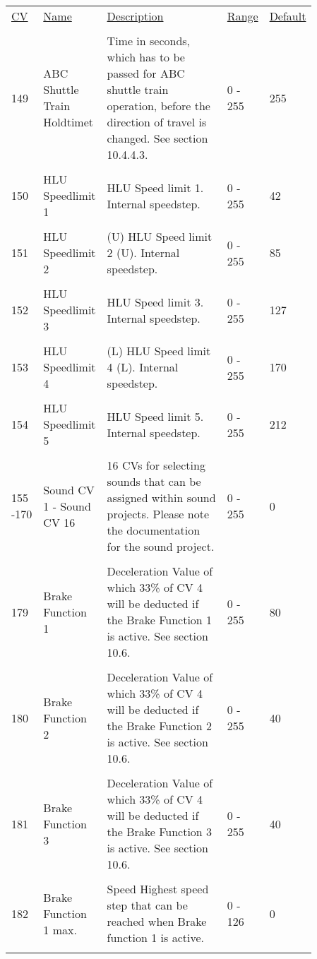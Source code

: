 \begin{tabular}{p{0.075\linewidth} p{0.15\linewidth} p{0.525\linewidth} p{0.06\linewidth} p{0.05\linewidth}} 
\underline{CV} & \underline{Name} &  \underline{Description} & \underline{Range} & \underline{Default}\\
\\
149 & ABC Shuttle Train Holdtimet & Time in seconds, which has to be passed for ABC shuttle train operation, before the direction of travel is changed. See section 10.4.4.3. & 0 - 255 & 255\\
\\
150 & HLU Speedlimit 1 & HLU Speed limit 1. Internal speedstep. & 0 - 255 & 42\\
\\
151 & HLU Speedlimit 2 &  (U) HLU Speed limit 2 (U). Internal speedstep. & 0 - 255 & 85\\
\\
152 & HLU Speedlimit 3 & HLU Speed limit 3. Internal speedstep. & 0 - 255 & 127\\
\\
153 & HLU Speedlimit 4 & (L) HLU Speed limit 4 (L). Internal speedstep. & 0 - 255 & 170\\
\\
154 & HLU Speedlimit 5 & HLU Speed limit 5. Internal speedstep. & 0 - 255 & 212\\
\\
155 -170 & Sound CV 1 - Sound CV 16 & 16 CVs for selecting sounds that can be assigned within sound projects. Please note the documentation for the sound project. & 0 - 255 & 0\\
\\
179 & Brake Function 1 & Deceleration Value of which 33\% of CV 4 will be deducted if the Brake Function 1 is active. See section 10.6. & 0 - 255 & 80\\
\\
180 & Brake Function 2 & Deceleration Value of which 33\% of CV 4 will be deducted if the Brake Function 2 is active. See section 10.6. & 0 - 255 & 40\\
\\
181 & Brake Function 3 & Deceleration Value of which 33\% of CV 4 will be deducted if the Brake Function 3 is active. See section 10.6. & 0 - 255 & 40\\
\\
182 & Brake Function 1 max. & Speed Highest speed step that can be reached when Brake function 1 is active. & 0 - 126 & 0\\
\\

\end{tabular}
